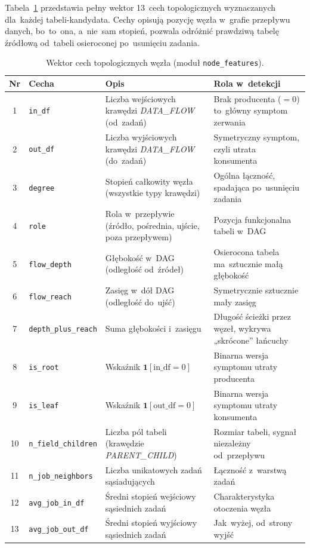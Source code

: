 Tabela~\ref{tab:cechy} przedstawia pełny wektor 13~cech topologicznych
wyznaczanych dla~każdej tabeli-kandydata. Cechy opisują pozycję węzła
w~grafie przepływu danych, bo~to~ona, a~nie~sam stopień, pozwala odróżnić
prawdziwą tabelę źródłową od~tabeli osieroconej po~usunięciu zadania.

\begin{table}[ht]
\centering
\caption[Wektor cech topologicznych węzła]{Wektor cech topologicznych węzła (moduł \texttt{node\_features}).}
\label{tab:cechy}
\small
\begin{tabular}{cl>{\raggedright\arraybackslash}p{5.2cm}>{\raggedright\arraybackslash}p{4.6cm}}
\toprule
\textbf{Nr} & \textbf{Cecha} & \textbf{Opis} & \textbf{Rola w~detekcji} \\
\midrule
1 & \texttt{in\_df} & Liczba wejściowych krawędzi \emph{DATA\_FLOW}
    (od~zadań) & Brak producenta ($=0$) to~główny symptom zerwania \\
2 & \texttt{out\_df} & Liczba wyjściowych krawędzi \emph{DATA\_FLOW}
    (do~zadań) & Symetryczny symptom, czyli utrata konsumenta \\
3 & \texttt{degree} & Stopień całkowity węzła (wszystkie typy krawędzi)
    & Ogólna łączność, spadająca po~usunięciu zadania \\
4 & \texttt{role} & Rola w~przepływie (źródło, pośrednia, ujście,
    poza przepływem) & Pozycja funkcjonalna tabeli w~DAG \\
5 & \texttt{flow\_depth} & Głębokość w~DAG (odległość od~źródeł)
    & Osierocona tabela ma~sztucznie małą głębokość \\
6 & \texttt{flow\_reach} & Zasięg w~dół DAG (odległość do~ujść)
    & Symetrycznie sztucznie mały zasięg \\
7 & \texttt{depth\_plus\_reach} & Suma głębokości i~zasięgu
    & Długość ścieżki przez węzeł, wykrywa „skrócone'' łańcuchy \\
8 & \texttt{is\_root} & Wskaźnik $\mathbf{1}[\mathrm{in\_df}=0]$
    & Binarna wersja symptomu utraty producenta \\
9 & \texttt{is\_leaf} & Wskaźnik $\mathbf{1}[\mathrm{out\_df}=0]$
    & Binarna wersja symptomu utraty konsumenta \\
10 & \texttt{n\_field\_children} & Liczba pól tabeli (krawędzie
    \emph{PARENT\_CHILD}) & Rozmiar tabeli, sygnał niezależny
    od~przepływu \\
11 & \texttt{n\_job\_neighbors} & Liczba unikatowych zadań sąsiadujących
    & Łączność z~warstwą zadań \\
12 & \texttt{avg\_job\_in\_df} & Średni stopień wejściowy sąsiednich zadań
    & Charakterystyka otoczenia węzła \\
13 & \texttt{avg\_job\_out\_df} & Średni stopień wyjściowy sąsiednich
    zadań & Jak~wyżej, od~strony wyjść \\
\bottomrule
\end{tabular}
\end{table}


